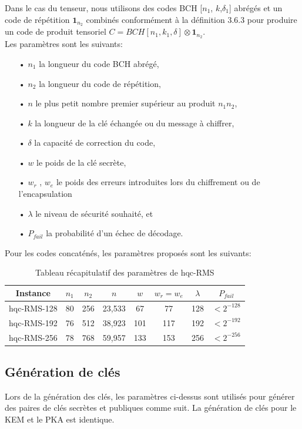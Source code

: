 \documentclass[12pt,openany]{report}
\begin{document}
Dans le cas du tenseur, nous utilisons des codes BCH [$n_1$, $k$,$\delta_1$] abrégés et un code
de répétition $\mathbf{1}_{n_2} $ combinés conformément à la définition 3.6.3 pour produire un code de produit tensoriel $\mathit{C} =BCH[n_1, k_1,\delta] \otimes \mathbf{1}_{n_2}$.\\
Les paramètres sont les suivants:
\begin{itemize}
\item[•] $n_1$ la longueur du code BCH abrégé,
\item[•] $n_2$ la longueur du code de répétition,
\item[•] $n$ le plus petit nombre premier supérieur au produit $n_1n_2$,
\item[•] $k$ la longueur de la clé échangée ou du message à chiffrer,
\item[•] $\delta$ la capacité de correction du code,
\item[•] $w$ le poids de la clé secrète,
\item[• ] $w_r$ , $w_e$ le poids des erreurs introduites lors du chiffrement ou de l'encapsulation
\item[•] $\lambda$ le niveau de sécurité souhaité, et
\item[•] $P_{fail}$ la probabilité d'un échec de décodage.

\end{itemize}
Pour les codes concaténés, les paramètres proposés sont les suivants: 

\begin{table}
\centering
\begin{tabular}{|c||c|c|c|c|c|c|c| }
\hline
 Instance & $n_1$ & $ n_2$&$n$&$w$&$ w_r=w_e$&$\lambda$&$P_{fail}$\\ 
 \hline
hqc-RMS-128&80&256&23,533&67&77&128&$<2^{-128} $\\
\hline
hqc-RMS-192&76&512&38,923&101&117&192&$<2^{-192} $\\
\hline
hqc-RMS-256&78&768& 59,957&133&153&256&$<2^{-256} $\\
\hline
\end{tabular}
\caption{Tableau récapitulatif des paramètres de hqc-RMS}
\label{hqc-rms}
\end{table}
\subsection{Génération de clés}
Lors de la génération des clés, les paramètres ci-dessus sont utilisés pour générer des paires de clés secrètes et publiques comme suit. La génération de clés pour le KEM et le PKA est identique.
\end{document}
